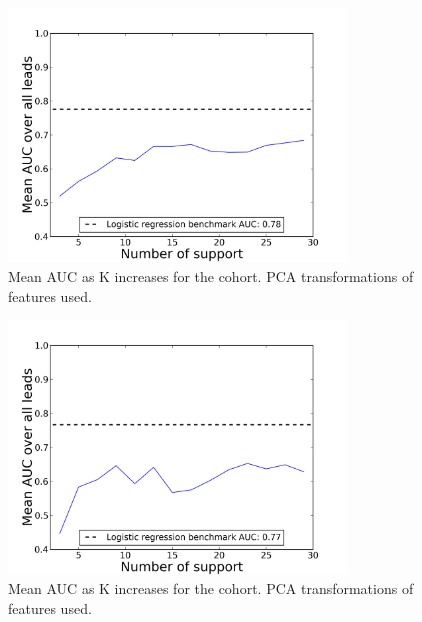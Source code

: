 \begin{figure}[ht!]
  \caption{Mean AUC as K increases for the \neither cohort. PCA transformations of features used.}\label{fig:hmm_support_over_time_no_collab_pca}
  \centering
    \includegraphics[width=0.8\textwidth]{figures/hmm/no_collab_pca_support_over_time.png}
\end{figure}

\begin{figure}[ht!]
  \caption{Mean AUC as K increases for the \forum cohort. PCA transformations of features used.}\label{fig:hmm_support_over_time_forum_only_pca}
  \centering
    \includegraphics[width=0.8\textwidth]{figures/hmm/forum_only_pca_support_over_time.png}
\end{figure}

